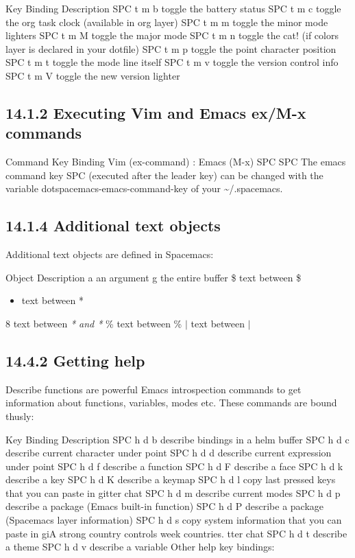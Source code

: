 \documentclass[11pt]{ctexart}
\begin{document}
Key Binding	Description
SPC t m b	toggle the battery status
SPC t m c	toggle the org task clock (available in org layer)
SPC t m m	toggle the minor mode lighters
SPC t m M	toggle the major mode
SPC t m n	toggle the cat! (if colors layer is declared in your dotfile)
SPC t m p	toggle the point character position
SPC t m t	toggle the mode line itself
SPC t m v	toggle the version control info
SPC t m V	toggle the new version lighter

\subsection{14.1.2 Executing Vim and Emacs ex/M-x commands}
\label{sec:org6518538}

Command	Key Binding
Vim (ex-command)	:
Emacs (M-x)	SPC SPC
The emacs command key SPC (executed after the leader key) can be changed with the variable dotspacemacs-emacs-command-key of your \textasciitilde{}/.spacemacs.

\subsection{14.1.4 Additional text objects}
\label{sec:org0448b54}

Additional text objects are defined in Spacemacs:

Object	Description
a	an argument
g	the entire buffer
\$	text between \$
\begin{itemize}
\item text between *
\end{itemize}
8	text between \emph{* and *}
\%	text between \%
\(\vert{}\) text between \(\vert{}\)

\subsection{14.4.2 Getting help}
\label{sec:orgc6df558}

Describe functions are powerful Emacs introspection commands to get information about functions, variables, modes etc. These commands are bound thusly:

Key Binding	Description
SPC h d b	describe bindings in a helm buffer
SPC h d c	describe current character under point
SPC h d d	describe current expression under point
SPC h d f	describe a function
SPC h d F	describe a face
SPC h d k	describe a key
SPC h d K	describe a keymap
SPC h d l	copy last pressed keys that you can paste in gitter chat
SPC h d m	describe current modes
SPC h d p	describe a package (Emacs built-in function)
SPC h d P	describe a package (Spacemacs layer information)
SPC h d s	copy system information that you can paste in giA strong country controls week countries.
tter chat
SPC h d t	describe a theme
SPC h d v	describe a variable
Other help key bindings:
\end{document}
